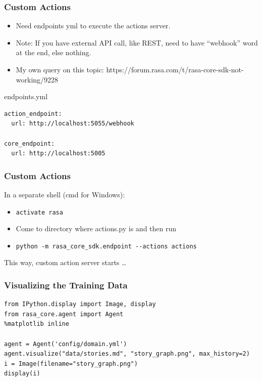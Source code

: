  \begin{frame}[fragile]\frametitle{Custom Actions}

\begin{itemize}
\item Need endpoints yml to execute the actions server.
\item Note: If you have external API call, like REST, need to have ``webhook'' word at the end, else nothing.
\item My own query on this topic: https://forum.rasa.com/t/rasa-core-sdk-not-working/9228
\end{itemize}

endpoints.yml
\begin{lstlisting}
action_endpoint:
  url: http://localhost:5055/webhook

core_endpoint:
  url: http://localhost:5005
\end{lstlisting}
\end{frame}

 \begin{frame}[fragile]\frametitle{Custom Actions}

 In a separate shell (cmd for Windows):
 
\begin{itemize}
\item \lstinline|activate rasa|
\item Come to directory where actions.py is and then run
\item \lstinline|python -m rasa_core_sdk.endpoint --actions actions|
\end{itemize}

This way, custom action server starts \ldots
\end{frame}

 \begin{frame}[fragile]\frametitle{Visualizing the Training Data}


\begin{lstlisting}
from IPython.display import Image, display
from rasa_core.agent import Agent
%matplotlib inline

agent = Agent('config/domain.yml')
agent.visualize("data/stories.md", "story_graph.png", max_history=2)
i = Image(filename="story_graph.png")
display(i)
\end{lstlisting}

\end{frame}

